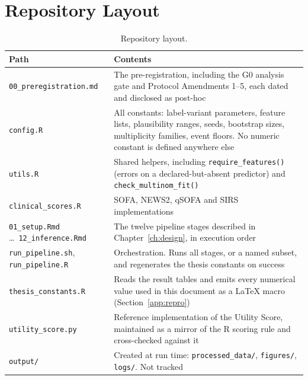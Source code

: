 \section{Repository Layout}

\begin{table}[H]
    \centering\small
    \begin{tabular}{p{4.6cm}p{8.4cm}}
        \toprule
        \textbf{Path} & \textbf{Contents} \\
        \midrule
        \texttt{00\_preregistration.md} &
        The pre-registration, including the G0 analysis gate and Protocol
        Amendments 1--5, each dated and disclosed as post-hoc \\
        \addlinespace
        \texttt{config.R} &
        All constants: label-variant parameters, feature lists, plausibility
        ranges, seeds, bootstrap sizes, multiplicity families, event floors.
        No numeric constant is defined anywhere else \\
        \addlinespace
        \texttt{utils.R} &
        Shared helpers, including \texttt{require\_features()} (errors on a
        declared-but-absent predictor) and \texttt{check\_multinom\_fit()} \\
        \addlinespace
        \texttt{clinical\_scores.R} &
        SOFA, NEWS2, qSOFA and SIRS implementations \\
        \addlinespace
        \texttt{01\_setup.Rmd} \dots\ \texttt{12\_inference.Rmd} &
        The twelve pipeline stages described in Chapter~\ref{ch:design}, in
        execution order \\
        \addlinespace
        \texttt{run\_pipeline.sh}, \texttt{run\_pipeline.R} &
        Orchestration. Runs all stages, or a named subset, and regenerates the
        thesis constants on success \\
        \addlinespace
        \texttt{thesis\_constants.R} &
        Reads the result tables and emits every numerical value used in this
        document as a \LaTeX{} macro (Section~\ref{app:repro}) \\
        \addlinespace
        \texttt{utility\_score.py} &
        Reference implementation of the Utility Score, maintained as a mirror
        of the R scoring rule and cross-checked against it \\
        \addlinespace
        \texttt{output/} &
        Created at run time: \texttt{processed\_data/}, \texttt{figures/},
        \texttt{logs/}. Not tracked \\
        \bottomrule
    \end{tabular}
    \caption{Repository layout.}
    \label{tab:repo_layout}
\end{table}


